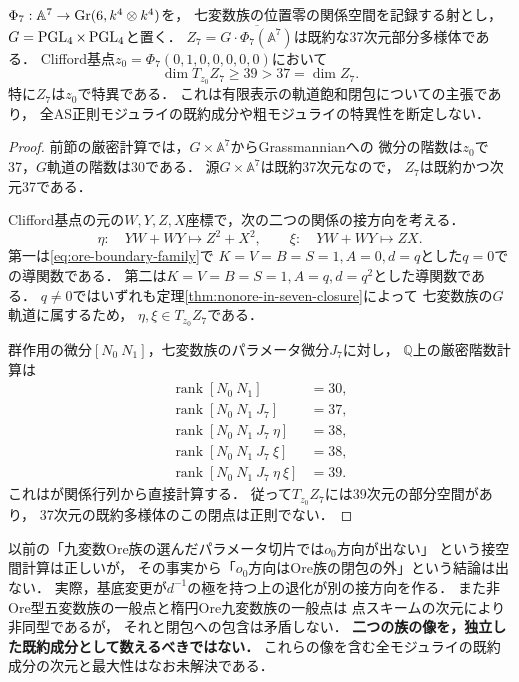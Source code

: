 \begin{theorem}[七変数族の軌道飽和閉包はClifford点で特異]
\label{thm:seven-closure-singular}
$\Phi_7:\mathbb A^7\to\operatorname{Gr}(6,k^4\otimes k^4)$を，
七変数族の位置零の関係空間を記録する射とし，
$G=\operatorname{PGL}_4\times\operatorname{PGL}_4$と置く．
$Z_7=\overline{G\cdot\Phi_7(\mathbb A^7)}$は既約な37次元部分多様体である．
Clifford基点$z_0=\Phi_7(0,1,0,0,0,0,0)$において
\[
 \dim T_{z_0}Z_7\ge39>37=\dim Z_7.
\]
特に$Z_7$は$z_0$で特異である．
これは有限表示の軌道飽和閉包についての主張であり，
全AS正則モジュライの既約成分や粗モジュライの特異性を断定しない．
\end{theorem}
\begin{proof}
前節の厳密計算では，$G\times\mathbb A^7$からGrassmannianへの
微分の階数は$z_0$で37，$G$軌道の階数は30である．
源$G\times\mathbb A^7$は既約37次元なので，
$Z_7$は既約かつ次元37である．

Clifford基点の元の$W,Y,Z,X$座標で，次の二つの関係の接方向を考える．
\[
 \eta:\quad YW+WY\mapsto Z^2+X^2,\qquad
 \xi:\quad YW+WY\mapsto ZX.
\]
第一は\eqref{eq:ore-boundary-family}で
$K=V=B=S=1,A=0,d=q$とした$q=0$での導関数である．
第二は$K=V=B=S=1,A=q,d=q^2$とした導関数である．
$q\ne0$ではいずれも定理\ref{thm:nonore-in-seven-closure}によって
七変数族の$G$軌道に属するため，
$\eta,\xi\in T_{z_0}Z_7$である．

群作用の微分$[N_0\ N_1]$，七変数族のパラメータ微分$J_7$に対し，
$\mathbb Q$上の厳密階数計算は
\[
 \begin{aligned}
 \operatorname{rank}[N_0\ N_1]&=30,\\
 \operatorname{rank}[N_0\ N_1\ J_7]&=37,\\
 \operatorname{rank}[N_0\ N_1\ J_7\ \eta]&=38,\\
 \operatorname{rank}[N_0\ N_1\ J_7\ \xi]&=38,\\
 \operatorname{rank}[N_0\ N_1\ J_7\ \eta\ \xi]&=39.
 \end{aligned}
\]
これはが関係行列から直接計算する．
従って$T_{z_0}Z_7$には39次元の部分空間があり，
37次元の既約多様体のこの閉点は正則でない．
\end{proof}

\begin{remark}
以前の「九変数Ore族の選んだパラメータ切片では$o_0$方向が出ない」
という接空間計算は正しいが，
その事実から「$o_0$方向はOre族の閉包の外」という結論は出ない．
実際，基底変更が$d^{-1}$の極を持つ上の退化が別の接方向を作る．
また非Ore型五変数族の一般点と楕円Ore九変数族の一般点は
点スキームの次元により非同型であるが，
それと閉包への包含は矛盾しない．
\textbf{二つの族の像を，独立した既約成分として数えるべきではない．}
これらの像を含む全モジュライの既約成分の次元と最大性はなお未解決である．
\end{remark}
